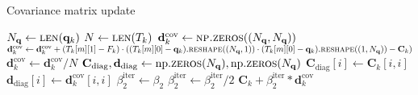 \begin{algorithm}[H]%
\caption{\label{updateCovAlg}Covariance matrix update}
\begin{algorithmic}[1]
\State $N_\mathbf{q}\gets \Call{len}{\mathbf{q}_k}$
\State $N\gets \Call{len}{T_k}$
\State $\mathbf{d}^\mathrm{cov}_k \gets \Call{np.zeros}{(N_\mathbf{q}, N_\mathbf{q})}$
\State $\mathbf{d}^\mathrm{cov}_k \gets \mathbf{d}^\mathrm{cov}_k + (T_k[m][1]-F_k)\cdot((T_k[m][0]-\mathbf{q}_k).\Call{reshape}{(N_\mathbf{q},1)}\cdot(T_k[m][0]-\mathbf{q}_k).\Call{reshape}{(1,N_\mathbf{q})}-\mathbf{C}_k)$
\EndFor
\State $\mathbf{d}^\mathrm{cov}_k \gets \mathbf{d}^\mathrm{cov}_k/N$
\State $\mathbf{C}_\mathrm{diag}, \mathbf{d}_\mathrm{diag}\gets\mathrm{np.}\Call{zeros}{N_\mathbf{q}}, \mathrm{np.}\Call{zeros}{N_\mathbf{q}}$
\State $\mathbf{C}_\mathrm{diag}[i]\gets\mathbf{C}_k[i, i]$
\State $\mathbf{d}_\mathrm{diag}[i]\gets\mathbf{d}^\mathrm{cov}_k[i, i]$
\EndFor
\State $\beta^\mathrm{iter}_2\gets\beta_2$
\State $\beta^\mathrm{iter}_2 \gets \beta^\mathrm{iter}_2/2$
\EndWhile
\State \Return $\mathbf{C}_k+\beta^\mathrm{iter}_2*\mathbf{d}^\mathrm{cov}_k$
\EndFunction
\end{algorithmic}
\end{algorithm}

